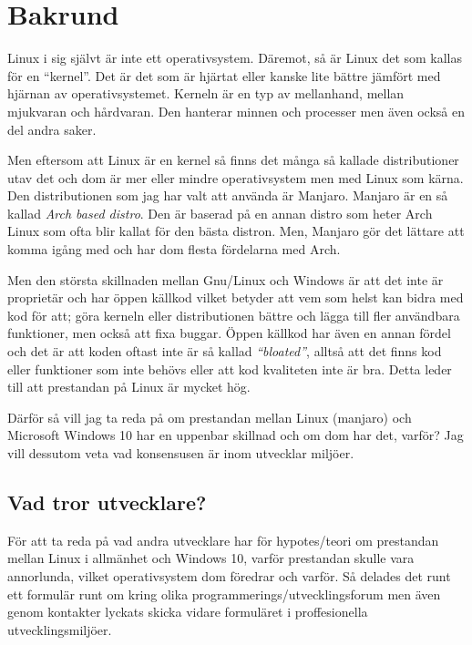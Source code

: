 \documentclass[a4paper, 12pt]{report}
\begin{document}
\section{Bakrund}

    Linux i sig självt är inte ett operativsystem. Däremot, så är Linux det som kallas för en ``kernel''\cite{redhat}. Det är det som är hjärtat eller kanske lite bättre jämfört med hjärnan av operativsystemet. Kerneln är en typ av mellanhand, mellan mjukvaran och hårdvaran. Den hanterar minnen och processer men även också en del andra saker.

    Men eftersom att Linux är en kernel så finns det många så kallade distributioner utav det och dom är mer eller mindre operativsystem men med Linux som kärna. Den distributionen som jag har valt att använda är Manjaro\cite{manjaro}. Manjaro är en så kallad \textit{Arch based distro}. Den är baserad på en annan distro som heter Arch Linux som ofta blir kallat för den bästa distron. Men, Manjaro gör det lättare att komma igång med och har dom flesta fördelarna med Arch.

    Men den största skillnaden mellan Gnu/Linux och Windows är att det inte är proprietär och har öppen källkod vilket betyder att vem som helst kan bidra med kod för att; göra kerneln eller distributionen bättre och lägga till fler användbara funktioner, men också att fixa buggar. Öppen källkod har även en annan fördel och det är att koden oftast inte är så kallad \textit{``bloated''}, alltså att det finns kod eller funktioner som inte behövs eller att kod kvaliteten inte är bra. Detta leder till att prestandan på Linux är mycket hög. 
    
    Därför så vill jag ta reda på om prestandan mellan Linux (manjaro) och Microsoft Windows 10 har en uppenbar skillnad och om dom har det, varför? Jag vill dessutom veta vad konsensusen är inom utvecklar miljöer.

\subsection{Vad tror utvecklare?}

    För att ta reda på vad andra utvecklare har för hypotes/teori om prestandan mellan Linux i allmänhet och Windows 10, varför prestandan skulle vara annorlunda, vilket operativsystem dom föredrar och varför.  Så delades det runt ett formulär runt om kring olika programmerings/utvecklingsforum men även genom kontakter lyckats skicka vidare formuläret i proffesionella utvecklingsmiljöer.
\end{document}
